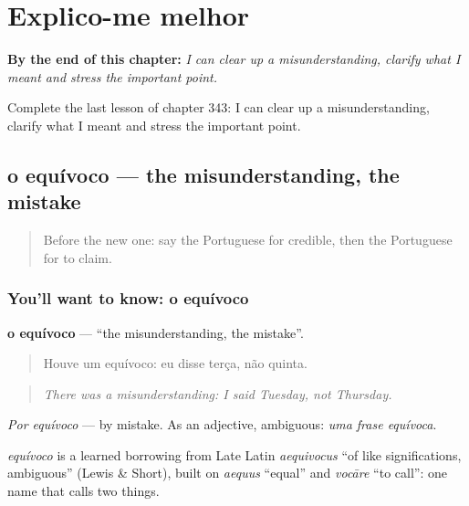 
\chapter{Explico-me melhor}
\label{ch:pt-explico-me-melhor}

\begin{chapteropening}
\textbf{By the end of this chapter:} \emph{I can clear up a misunderstanding, clarify what I meant and stress the important point.}

Complete the last lesson of chapter 343: I can clear up a misunderstanding, clarify what I meant and stress the important point.
\end{chapteropening}

\section[o equívoco]{o equívoco — the misunderstanding, the mistake}

\label{lesson:PT-C343-equivoco}



\begin{quote}
Before the new one: say the Portuguese for credible, then the Portuguese for to claim.
\end{quote}

\subsection*{You'll want to know: o equívoco}
\textbf{o equívoco} — \textquotedblleft{}the misunderstanding, the mistake\textquotedblright{}.

\begin{quote}
Houve um equívoco: eu disse terça, não quinta.
\end{quote}

\begin{quote}
\emph{There was a misunderstanding: I said Tuesday, not Thursday.}
\end{quote}

\emph{Por equívoco} — by mistake. As an adjective, ambiguous: \emph{uma frase equívoca}.

\begin{cousinweb}
\emph{equívoco} is a learned borrowing from Late Latin \emph{aequivocus} \textquotedblleft{}of like significations, ambiguous\textquotedblright{} (Lewis \& Short), built on \emph{aequus} \textquotedblleft{}equal\textquotedblright{} and \emph{vocāre} \textquotedblleft{}to call\textquotedblright{}: one name that calls two things.
\end{cousinweb}

